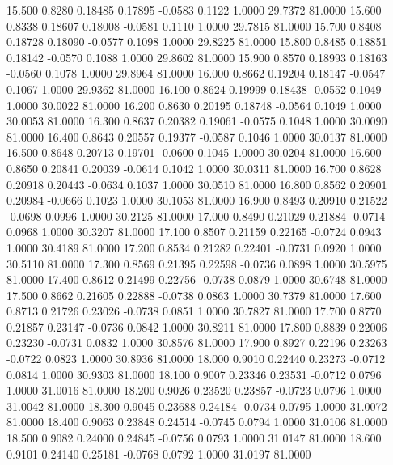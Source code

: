   15.500   0.8280   0.18485   0.17895  -0.0583   0.1122   1.0000  29.7372  81.0000
  15.600   0.8338   0.18607   0.18008  -0.0581   0.1110   1.0000  29.7815  81.0000
  15.700   0.8408   0.18728   0.18090  -0.0577   0.1098   1.0000  29.8225  81.0000
  15.800   0.8485   0.18851   0.18142  -0.0570   0.1088   1.0000  29.8602  81.0000
  15.900   0.8570   0.18993   0.18163  -0.0560   0.1078   1.0000  29.8964  81.0000
  16.000   0.8662   0.19204   0.18147  -0.0547   0.1067   1.0000  29.9362  81.0000
  16.100   0.8624   0.19999   0.18438  -0.0552   0.1049   1.0000  30.0022  81.0000
  16.200   0.8630   0.20195   0.18748  -0.0564   0.1049   1.0000  30.0053  81.0000
  16.300   0.8637   0.20382   0.19061  -0.0575   0.1048   1.0000  30.0090  81.0000
  16.400   0.8643   0.20557   0.19377  -0.0587   0.1046   1.0000  30.0137  81.0000
  16.500   0.8648   0.20713   0.19701  -0.0600   0.1045   1.0000  30.0204  81.0000
  16.600   0.8650   0.20841   0.20039  -0.0614   0.1042   1.0000  30.0311  81.0000
  16.700   0.8628   0.20918   0.20443  -0.0634   0.1037   1.0000  30.0510  81.0000
  16.800   0.8562   0.20901   0.20984  -0.0666   0.1023   1.0000  30.1053  81.0000
  16.900   0.8493   0.20910   0.21522  -0.0698   0.0996   1.0000  30.2125  81.0000
  17.000   0.8490   0.21029   0.21884  -0.0714   0.0968   1.0000  30.3207  81.0000
  17.100   0.8507   0.21159   0.22165  -0.0724   0.0943   1.0000  30.4189  81.0000
  17.200   0.8534   0.21282   0.22401  -0.0731   0.0920   1.0000  30.5110  81.0000
  17.300   0.8569   0.21395   0.22598  -0.0736   0.0898   1.0000  30.5975  81.0000
  17.400   0.8612   0.21499   0.22756  -0.0738   0.0879   1.0000  30.6748  81.0000
  17.500   0.8662   0.21605   0.22888  -0.0738   0.0863   1.0000  30.7379  81.0000
  17.600   0.8713   0.21726   0.23026  -0.0738   0.0851   1.0000  30.7827  81.0000
  17.700   0.8770   0.21857   0.23147  -0.0736   0.0842   1.0000  30.8211  81.0000
  17.800   0.8839   0.22006   0.23230  -0.0731   0.0832   1.0000  30.8576  81.0000
  17.900   0.8927   0.22196   0.23263  -0.0722   0.0823   1.0000  30.8936  81.0000
  18.000   0.9010   0.22440   0.23273  -0.0712   0.0814   1.0000  30.9303  81.0000
  18.100   0.9007   0.23346   0.23531  -0.0712   0.0796   1.0000  31.0016  81.0000
  18.200   0.9026   0.23520   0.23857  -0.0723   0.0796   1.0000  31.0042  81.0000
  18.300   0.9045   0.23688   0.24184  -0.0734   0.0795   1.0000  31.0072  81.0000
  18.400   0.9063   0.23848   0.24514  -0.0745   0.0794   1.0000  31.0106  81.0000
  18.500   0.9082   0.24000   0.24845  -0.0756   0.0793   1.0000  31.0147  81.0000
  18.600   0.9101   0.24140   0.25181  -0.0768   0.0792   1.0000  31.0197  81.0000
